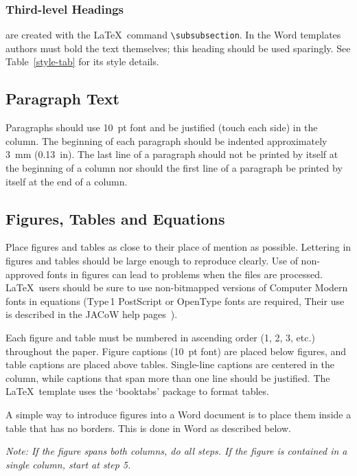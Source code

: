 \documentclass[a4paper,
              ]{jacow}
\begin{document}
\subsubsection{Third-level Headings} are created with the \LaTeX\ command \verb|\subsubsection|.
In the Word templates authors must bold the text themselves; this
heading should be used sparingly. See Table~\ref{style-tab} for its
style details.

\subsection{Paragraph Text}

Paragraphs should use \SI{10}{pt} font and be justified (touch each side) in
the column. The beginning of each paragraph should be indented
approximately \SI{3}{mm} (\SI{0.13}{in}). The last line of a paragraph should not be
printed by itself at the beginning of a column nor should the first line of
a paragraph be printed by itself at the end of a column.

\subsection{Figures, Tables and Equations}

Place figures and tables as close to their place of mention as
possible. Lettering in figures and tables should be large enough to
reproduce clearly. Use of non-approved fonts in figures can lead to
problems when the files are processed. \LaTeX\ users should be sure to use
non-bitmapped versions of Computer Modern fonts in equations (Type\,1 PostScript
or OpenType fonts are required, Their use is described in the JACoW help
pages~\cite{jacow-help}).

Each figure and table must be numbered in ascending order (1, 2, 3, etc.) throughout
the paper. Figure captions (\SI{10}{pt} font) are placed below figures, and table captions are placed above tables. Single-line captions are centered in the column, while captions that span more than one line should be justified. The \LaTeX\ template uses the ‘booktabs’ package to
format tables.

A simple way to introduce figures into a Word document is to place them inside a table that has no borders. This is done in Word as described below.

\textit{Note: If the figure spans both columns, do all steps. If
the figure is contained in a single column, start at step 5.}
\end{document}
